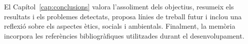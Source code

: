 El Capítol~\ref{cap:conclusions} valora l’assoliment dels objectius, resumeix els resultats i els problemes detectats, proposa línies de treball futur i inclou una reflexió sobre els aspectes ètics, socials i ambientals. Finalment, la memòria incorpora les referències bibliogràfiques utilitzades durant el desenvolupament.











